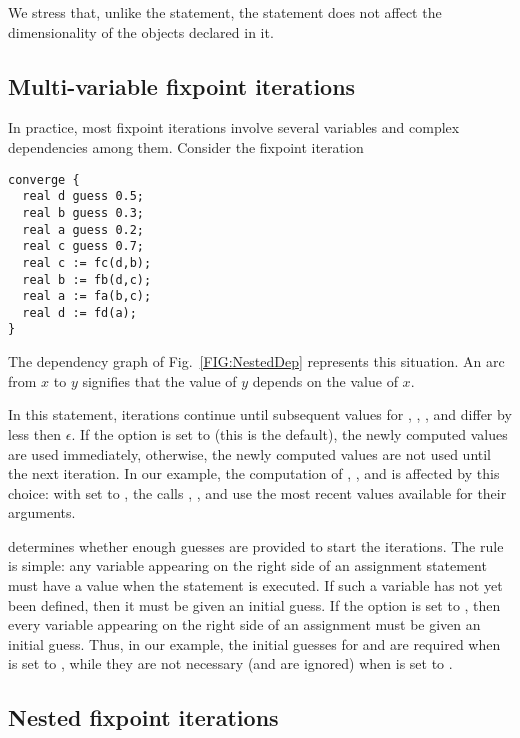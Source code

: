 We stress that, unlike the  statement, the 
statement does not affect the dimensionality of the objects declared in it.



\subsection{Multi-variable fixpoint iterations} \label{SEC:multconv}

In practice, most fixpoint iterations involve several variables and
complex dependencies among them.
Consider the fixpoint iteration
\begin{lstlisting}
converge {
  real d guess 0.5;
  real b guess 0.3;
  real a guess 0.2;
  real c guess 0.7;
  real c := fc(d,b);
  real b := fb(d,c);
  real a := fa(b,c);
  real d := fd(a);
}
\end{lstlisting}
The dependency graph of Fig.~\ref{FIG:NestedDep} represents this
situation.  An arc from $x$ to $y$ signifies that the value of $y$
depends on the value of $x$.  

In this  statement, iterations continue until
subsequent values for , , , and  differ by
less then $\epsilon$.
If the option  is set to  (this is the default),
the newly computed values are used immediately, otherwise,
the newly computed values are not used until the next iteration.  
In our example, the computation of , , and  is
affected by this choice:
with  set to , the calls
, , and  use the most recent values
available for their arguments.

{\smart} determines whether enough guesses are provided to start the iterations.
The rule is simple: any variable appearing on the right
side of an assignment statement must have a value when the statement
is executed.  If such a variable has not yet been defined, then it
must be given an initial guess.  If the option  is set
to , then every variable appearing on the right side of an
assignment must be given an initial guess.
Thus, in our example, the initial guesses for  and  are
required when  is set to , while 
they are not necessary (and are ignored) when 
is set to .

\subsection{Nested fixpoint iterations}

